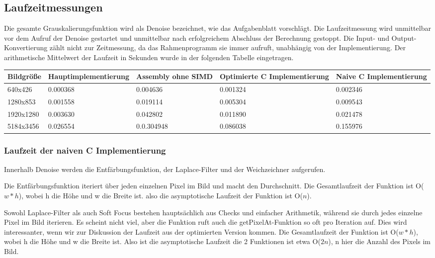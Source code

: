 \documentclass[course=asp]{aspdoc}
\begin{document}
\subsection{Laufzeitmessungen}
Die gesamte Grauskalierungsfunktion wird als Denoise bezeichnet, wie das Aufgabenblatt vorschlägt. Die Laufzeitmessung wird unmittelbar vor dem Aufruf der Denoise gestartet und unmittelbar nach erfolgreichem Abschluss der Berechnung gestoppt. Die Input- und Output-Konvertierung zählt nicht zur Zeitmessung, da das Rahmenprogramm sie immer aufruft, unabhängig von der Implementierung.
Der arithmetische Mittelwert der Laufzeit in Sekunden wurde in der folgenden Tabelle eingetragen.

\begin{center}
    \begin{table}[ht]
        \centering
        \begin{tabular}{ |m{7em}|m{7em}|m{7em}|m{7em}|m{7em}| }
        \hline
        Bildgröße & Hauptimplementierung & Assembly ohne SIMD & Optimierte C Implementierung & Naive C Implementierung \\
        \hline
        \hline
            640x426 & 0.000368 & 0.004636 & 0.001324 & 0.002346\\ 
        \hline
            1280x853 & 0.001558 & 0.019114 & 0.005304 & 0.009543\\
        \hline
            1920x1280 & 0.003630 & 0.042802 & 0.011890 & 0.021478\\
        \hline
            5184x3456 & 0.026554 & 0.0.304948 & 0.086038 & 0.155976\\
        \end{tabular}
        \label{tab:Versionsunterschiede}
    \end{table}
\end{center}

\subsubsection{Laufzeit der naiven C Implementierung}
 Innerhalb Denoise werden die Entfärbungsfunktion, der Laplace-Filter und der Weichzeichner aufgerufen. 

Die Entfärbungsfunktion iteriert über jeden einzelnen Pixel im Bild und macht den Durchschnitt. Die Gesamtlaufzeit der Funktion ist O($w*h$), wobei h die Höhe und w die Breite ist. also die asymptotische Laufzeit der Funktion ist O($n$).

Sowohl Laplace-Filter als auch Soft Focus bestehen hauptsächlich aus Checks und einfacher Arithmetik, während sie durch jedes einzelne Pixel im Bild iterieren. Es scheint nicht viel, aber die Funktion ruft auch die getPixelAt-Funktion so oft pro Iteration auf. Dies wird interessanter, wenn wir zur Diskussion der Laufzeit aus der optimierten Version kommen. Die Gesamtlaufzeit der Funktion ist O($w*h$), wobei h die Höhe und w die Breite ist. Also ist die asymptotische Laufzeit die 2 Funktionen ist etwa O($2n$), n hier die Anzahl des Pixels im Bild.
\end{document}
